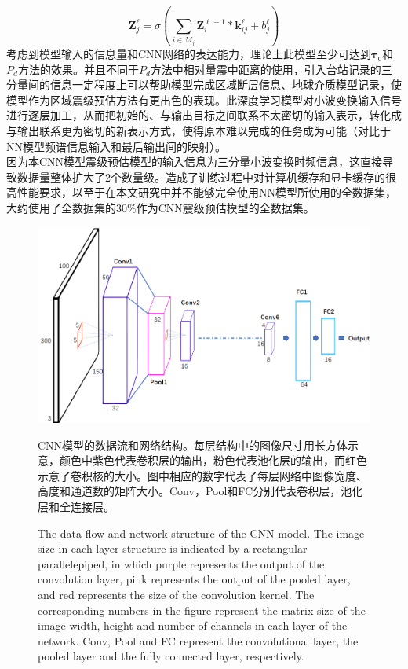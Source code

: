\begin{equation}
\mathbf{Z}_{j}^{\ell}=\sigma\left(\sum_{i \in M_{j}} \mathbf{Z}_{i}^{\ell-1} * \mathbf{k}_{i j}^{\ell}+b_{j}^{\ell}\right)
\end{equation}
\indent 考虑到模型输入的信息量和CNN网络的表达能力，理论上此模型至少可达到$\mathbf{\tau}_{\mathrm{c}}$和$P_{d}$方法的效果。并且不同于$P_{d}$方法中相对量震中距离的使用，引入台站记录的三分量间的信息一定程度上可以帮助模型完成区域断层信息、地球介质模型记录，使模型作为区域震级预估方法有更出色的表现。此深度学习模型对小波变换输入信号进行逐层加工，从而把初始的、与输出目标之间联系不太密切的输入表示，转化成与输出联系更为密切的新表示方式，使得原本难以完成的任务成为可能（对比于NN模型频谱信息输入和最后输出间的映射）。\\
\indent 因为本CNN模型震级预估模型的输入信息为三分量小波变换时频信息，这直接导致数据量整体扩大了2个数量级。造成了训练过程中对计算机缓存和显卡缓存的很高性能要求，以至于在本文研究中并不能够完全使用NN模型所使用的全数据集，大约使用了全数据集的30\%作为CNN震级预估模型的全数据集。\\
\begin{figure}[!h] 
\centering 
 \includegraphics[width=0.99\linewidth]{img/CNN-paper.jpg}
 \renewcommand{\figurename}{图} 
\caption{CNN模型的数据流和网络结构。每层结构中的图像尺寸用长方体示意，颜色中紫色代表卷积层的输出，粉色代表池化层的输出，而红色示意了卷积核的大小。图中相应的数字代表了每层网络中图像宽度、高度和通道数的矩阵大小。Conv，Pool和FC分别代表卷积层，池化层和全连接层。} 
\addtocounter{figure}{-1} \vspace{-5pt} 
\renewcommand{\figurename}{Fig} 
\caption{The data flow and network structure of the CNN model. The image size in each layer structure is indicated by a rectangular parallelepiped, in which purple represents the output of the convolution layer, pink represents the output of the pooled layer, and red represents the size of the convolution kernel. The corresponding numbers in the figure represent the matrix size of the image width, height and number of channels in each layer of the network. Conv, Pool and FC represent the convolutional layer, the pooled layer and the fully connected layer, respectively.} 
\renewcommand{\figurename}{图} 
\label{fig:network-device-influence.png} 
\end{figure}
